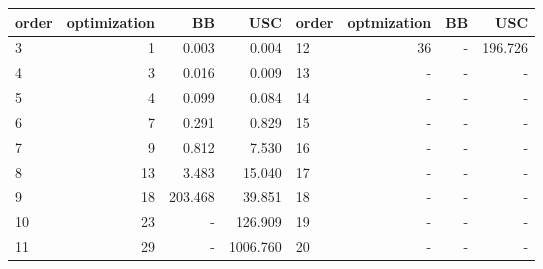 \begin{tabular}[l]{l|r|r|r||l|r|r|r}
 \hline
 order & optimization & BB & USC & order & optmization & BB & USC \\
 \hline
 3  & 1 & \alert{0.003}  & 0.004   & 12 & 36  & -  & \alert{196.726}  \\
 4  & 3 & 0.016  & \alert{0.009}   & 13 & - & - & - \\
 5  & 4 & 0.099  & \alert{0.084}   & 14 & - & -      & - \\
 6  & 7 & \alert{0.291}  & 0.829   & 15 & -  & -        & -     \\
 7  & 9 & \alert{0.812}  & 7.530   & 16 & - & -       & - \\
 8  & 13 & \alert{3.483}  & 15.040  & 17 & - & -        & - \\
 9  & 18 & 203.468  &  \alert{39.851}   & 18 & - & -        & - \\
 10 & 23 & -  & \alert{126.909}   & 19 & -  & -       & -       \\
 11 & 29 & -  & \alert{1006.760}   & 20 & -  & -    & -       \\
 \hline
\end{tabular}